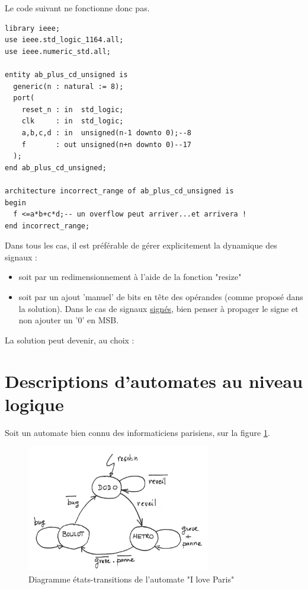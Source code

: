\documentclass[a4paper,11pt]{article}
\begin{document}
Le code suivant ne fonctionne donc pas.

\begin{lstlisting}
library ieee;
use ieee.std_logic_1164.all;
use ieee.numeric_std.all;

entity ab_plus_cd_unsigned is
  generic(n : natural := 8);
  port(
    reset_n : in  std_logic;
    clk     : in  std_logic;
    a,b,c,d : in  unsigned(n-1 downto 0);--8
    f       : out unsigned(n+n downto 0)--17
  );
end ab_plus_cd_unsigned;

architecture incorrect_range of ab_plus_cd_unsigned is
begin
  f <=a*b+c*d;-- un overflow peut arriver...et arrivera !
end incorrect_range;
\end{lstlisting}

Dans tous les cas, il est préférable de gérer explicitement la dynamique des signaux :
\begin{itemize}
  \item soit par un redimensionnement à l'aide de la fonction "resize"
  \item soit par un ajout 'manuel' de bits en tête des opérandes (comme proposé dans la solution). Dans le cas de signaux \underline{signés}, bien penser à propager le signe et non ajouter un '0' en MSB.
\end{itemize}

La solution peut devenir, au choix :


\section{Descriptions d'automates au niveau logique}
Soit un automate bien connu des informaticiens parisiens, sur la figure \ref{iloveparis}.

\begin{figure}
  \centering
  \includegraphics[width=8cm]{./iloveparis.png}
  \caption{Diagramme états-transitions de l'automate "I love Paris"}
  \label{iloveparis}
\end{figure}
\end{document}

